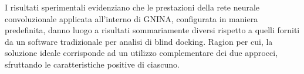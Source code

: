 I risultati sperimentali evidenziano che le prestazioni della rete neurale convoluzionale applicata all'interno di GNINA, configurata in maniera predefinita, danno luogo a risultati sommariamente diversi rispetto a quelli forniti da un software tradizionale per analisi di blind docking. Ragion per cui, la soluzione ideale corrisponde ad un utilizzo complementare dei due approcci, sfruttando le caratteristiche positive di ciascuno.
